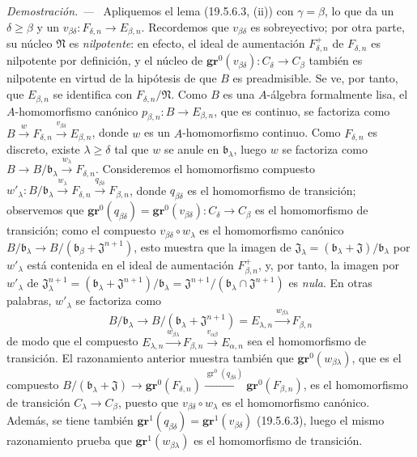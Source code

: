 \documentclass[10pt,oneside]{book}
\newcommand{\gr}{\operatorname{gr}}
\newenvironment{proof}{%
  \par\medskip\noindent\textit{Demostración. ---\ }}{\par}
\begin{document}
\begin{proof}
Apliquemos el lema (19.5.6.3, (ii)) con $\gamma=\beta$, lo que da un
$\delta\geq\beta$ y un
$v_{\beta\delta}:F_{\delta,n}\to E_{\beta,n}$. Recordemos que
$v_{\beta\delta}$ es sobreyectivo; por otra parte, su núcleo $\mathfrak N$ es
\emph{nilpotente}: en efecto, el ideal de aumentación $F_{\delta,n}^+$ de
$F_{\delta,n}$ es nilpotente por definición, y el núcleo de
$\mathbf{gr}^0(v_{\beta\delta}):C_\delta\to C_\beta$ también es nilpotente en virtud de
la hipótesis de que $B$ es preadmisible. Se ve, por tanto, que $E_{\beta,n}$
se identifica con $F_{\delta,n}/\mathfrak N$. Como $B$ es una $A$-álgebra
formalmente lisa, el $A$-homomorfismo canónico
$p_{\beta,n}:B\to E_{\beta,n}$, que es continuo, se factoriza como
$B\xrightarrow{w}F_{\delta,n}\xrightarrow{v_{\beta\delta}}E_{\beta,n}$, donde
$w$ es un $A$-homomorfismo continuo. Como $F_{\delta,n}$ es discreto, existe
$\lambda\geq\delta$ tal que $w$ se anule en $\mathfrak b_\lambda$, luego $w$
se factoriza como
$B\to B/\mathfrak b_\lambda\xrightarrow{w_\lambda}F_{\delta,n}$. Consideremos
el homomorfismo compuesto
$w'_\lambda:B/\mathfrak b_\lambda\xrightarrow{w_\lambda}F_{\delta,n}
\xrightarrow{q_{\beta\delta}}F_{\beta,n}$, donde $q_{\beta\delta}$ es
el homomorfismo de transición; observemos que
$\mathbf{gr}^0(q_{\beta\delta})=\mathbf{gr}^0(v_{\beta\delta}):C_\delta\to C_\beta$ es
el homomorfismo de transición; como el compuesto
$v_{\beta\delta}\circ w_\lambda$ es el homomorfismo
canónico $B/\mathfrak b_\lambda\to
B/(\mathfrak b_\beta+\mathfrak J^{n+1})$, esto muestra que la imagen de
$\mathfrak J_\lambda=(\mathfrak b_\lambda+\mathfrak J)/\mathfrak b_\lambda$
por $w'_\lambda$ está contenida en el ideal de aumentación
$F_{\beta,n}^+$, y, por tanto, la imagen por $w'_\lambda$ de
$\mathfrak J_\lambda^{n+1}=(\mathfrak b_\lambda+\mathfrak J^{n+1})/
\mathfrak b_\lambda=\mathfrak J^{n+1}/(\mathfrak b_\lambda\cap\mathfrak J^{n+1})$ es \emph{nula}. En otras palabras,
$w'_\lambda$ se factoriza como
\[
  B/\mathfrak b_\lambda\to
  B/(\mathfrak b_\lambda+\mathfrak J^{n+1})=E_{\lambda,n}
  \xrightarrow{w_{\beta\lambda}}F_{\beta,n}
\]
de modo que el compuesto
$E_{\lambda,n}\xrightarrow{w_{\beta\lambda}}F_{\beta,n}
\xrightarrow{v_{\alpha\beta}}E_{\alpha,n}$ sea el homomorfismo de transición.
El razonamiento anterior muestra también que $\mathbf{gr}^0(w_{\beta\lambda})$, que es
el compuesto
$B/(\mathfrak b_\lambda+\mathfrak J)\to\mathbf{gr}^0(F_{\delta,n})
\xrightarrow{\gr^0(q_{\beta\delta})}\mathbf{gr}^0(F_{\beta,n})$, es el homomorfismo
de transición $C_\lambda\to C_\beta$, puesto que
$v_{\beta\delta}\circ w_\lambda$ es el homomorfismo canónico. Además, se tiene también
$\mathbf{gr}^1(q_{\beta\delta})=\mathbf{gr}^1(v_{\beta\delta})$ (19.5.6.3), luego el mismo
razonamiento prueba que $\mathbf{gr}^1(w_{\beta\lambda})$ es el homomorfismo de
transición.
\end{proof}
\end{document}
